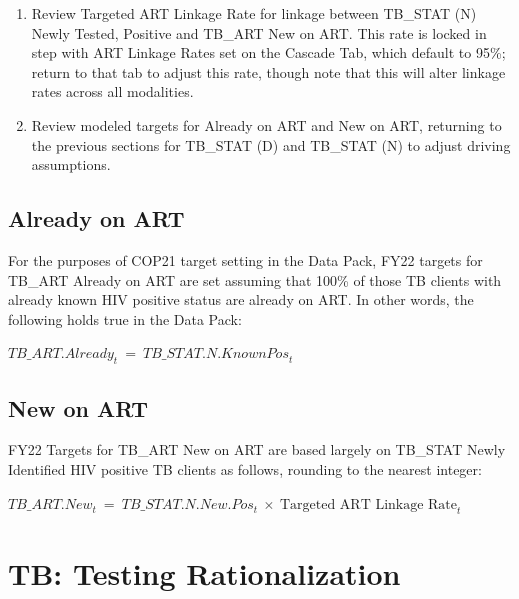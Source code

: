 \documentclass[
  openany]{book}
\begin{document}
\begin{enumerate}
\def\labelenumi{\arabic{enumi}.}
\item
  Review Targeted ART Linkage Rate for linkage between TB\_STAT (N)
  Newly Tested, Positive and TB\_ART New on ART. This rate is locked in
  step with ART Linkage Rates set on the Cascade Tab, which default to
  95\%; return to that tab to adjust this rate, though note that this
  will alter linkage rates across all modalities.
\item
  Review modeled targets for Already on ART and New on ART, returning
  to the previous sections for TB\_STAT (D) and TB\_STAT (N) to adjust
  driving assumptions.
\end{enumerate}

\hypertarget{already-on-art}{%
\subsection{Already on ART}\label{already-on-art}}

For the purposes of COP21 target setting in the Data Pack, FY22 targets
for TB\_ART Already on ART are set assuming that 100\% of those TB clients
with already known HIV positive status are already on ART. In other
words, the following holds true in the Data Pack:

\begin{center} ${TB\_ ART.Already}_{t}\  = \ {TB\_ STAT.N.KnownPos}_{t}$ \end{center}

\hypertarget{new-on-art}{%
\subsection{New on ART}\label{new-on-art}}

FY22 Targets for TB\_ART New on ART are based largely on TB\_STAT Newly
Identified HIV positive TB clients as follows, rounding to the nearest
integer:

\begin{center} ${TB\_ ART.New}_{t}\  = \ {TB\_ STAT.N.New.Pos}_{t}\  \times \ \text{Targeted ART Linkage Rate}_{t}$ \end{center}

\hypertarget{tb-testing-rationalization}{%
\section{TB: Testing Rationalization}\label{tb-testing-rationalization}}
\end{document}
